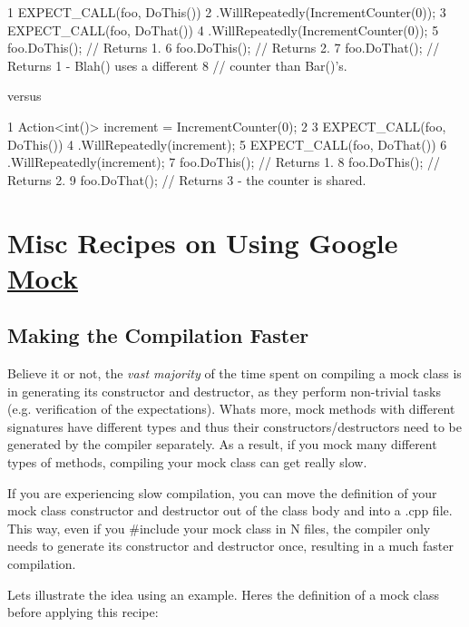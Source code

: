 \begin{DoxyCode}
1 EXPECT\_CALL(foo, DoThis())
2     .WillRepeatedly(IncrementCounter(0));
3 EXPECT\_CALL(foo, DoThat())
4     .WillRepeatedly(IncrementCounter(0));
5 foo.DoThis();  // Returns 1.
6 foo.DoThis();  // Returns 2.
7 foo.DoThat();  // Returns 1 - Blah() uses a different
8                // counter than Bar()'s.
\end{DoxyCode}


versus


\begin{DoxyCode}
1 Action<int()> increment = IncrementCounter(0);
2 
3 EXPECT\_CALL(foo, DoThis())
4     .WillRepeatedly(increment);
5 EXPECT\_CALL(foo, DoThat())
6     .WillRepeatedly(increment);
7 foo.DoThis();  // Returns 1.
8 foo.DoThis();  // Returns 2.
9 foo.DoThat();  // Returns 3 - the counter is shared.
\end{DoxyCode}


\section*{Misc Recipes on Using Google \hyperlink{classMock}{Mock}}

\subsection*{Making the Compilation Faster}

Believe it or not, the {\itshape vast majority} of the time spent on compiling a mock class is in generating its constructor and destructor, as they perform non-\/trivial tasks (e.\+g. verification of the expectations). What\textquotesingle{}s more, mock methods with different signatures have different types and thus their constructors/destructors need to be generated by the compiler separately. As a result, if you mock many different types of methods, compiling your mock class can get really slow.

If you are experiencing slow compilation, you can move the definition of your mock class\textquotesingle{} constructor and destructor out of the class body and into a {\ttfamily .cpp} file. This way, even if you {\ttfamily \#include} your mock class in N files, the compiler only needs to generate its constructor and destructor once, resulting in a much faster compilation.

Let\textquotesingle{}s illustrate the idea using an example. Here\textquotesingle{}s the definition of a mock class before applying this recipe\+:


